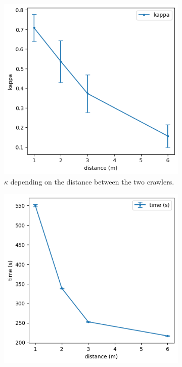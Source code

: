 \begin{figure}[h!]
	\begin{subfigure}[t]{0.49\linewidth}
		\includegraphics[width=\linewidth]{graphics/peinture_au_rouleau-kappa_vs_distance.png}
		\caption{$\kappa$ depending on the distance between the two crawlers.}
		\label{fig:peinture_au_rouleau-kappa_vs_distance}
	\end{subfigure}
	\hfill
	\begin{subfigure}[t]{0.49\linewidth}
			\includegraphics[width=\linewidth]{graphics/peinture_au_rouleau-time_vs_distance.png}

\end{subfigure}
\end{figure}
